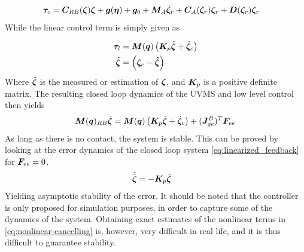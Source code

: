 \begin{align}
\boldsymbol	\tau_{c} &=
  \boldsymbol C_{RB}(\boldsymbol \zeta)\boldsymbol \zeta + \boldsymbol g(\boldsymbol \eta) + \boldsymbol g_0 + \boldsymbol M_A \dot{\boldsymbol \zeta}_r  + \boldsymbol C_A(\boldsymbol \zeta_r) \boldsymbol \zeta_r + \boldsymbol D(\boldsymbol \zeta_r) \boldsymbol \zeta_r 
	\label{eq:nonlinear-cancelling}
\end{align}
While the linear control term is simply given as

\begin{align}
	\boldsymbol \tau_{l} & =\boldsymbol M(\boldsymbol q) \left(\boldsymbol K_{p} \tilde{\boldsymbol \zeta} + \dot{\boldsymbol \zeta}_{c} \right) \\
	\label{eq:linfeedback-lin}
	\tilde{\boldsymbol \zeta} &=\left(\boldsymbol \zeta_{c} - \boldsymbol{ \hat \zeta } \right)
\end{align}
Where $\boldsymbol{ \hat \zeta } $ is the measured or estimation of $\boldsymbol \zeta$, and $\boldsymbol K_{p}$ is a positive definite matrix. The resulting closed loop dynamics of the UVMS and low level control then yields
\begin{align}
	\boldsymbol M(\boldsymbol q)_{RB}\dot{\boldsymbol \zeta} =\boldsymbol M(\boldsymbol q) \left(\boldsymbol K_{p} \tilde{\boldsymbol \zeta} + \dot{\boldsymbol \zeta}_{c} \right) + (\boldsymbol J_{ge}^B)^T \boldsymbol F_{ee}
	\label{eq:linearized_feedback}
\end{align}
As long as there is no contact, the system is stable. This can be proved by looking at the error dynamics of the closed loop system \eqref{eq:linearized_feedback} for $\boldsymbol F_{ee}=0$.
\begin{align}
	\dot{\tilde{\boldsymbol \zeta}} & =- \boldsymbol K_{p} \tilde{\boldsymbol \zeta} 
	\label{eq:errordynamics}
\end{align}
Yielding asymptotic stability of the error.
It should be noted that the controller is only proposed for simulation purposes, in order to capture some of the dynamics of the system. Obtaining exact estimates of the nonlinear terms in \eqref{eq:nonlinear-cancelling} is, however, very difficult in real life, and it is thus difficult to guarantee stability.











